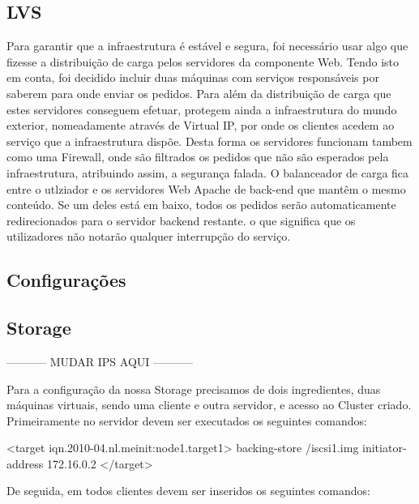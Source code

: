 \subsection{LVS}
Para garantir que a infraestrutura é estável e segura, foi necessário usar algo que fizesse a distribuição de carga pelos servidores da componente Web. Tendo isto em conta, foi decidido incluir duas máquinas com serviços responsáveis por saberem para onde enviar os pedidos. Para além da distribuição de carga que estes servidores conseguem efetuar, protegem ainda a infraestrutura do mundo exterior, nomeadamente através de Virtual IP, por onde os clientes acedem ao serviço que a infraestrutura dispõe. Desta forma os servidores funcionam tambem como uma Firewall, onde são filtrados os pedidos que não são esperados pela infraestrutura, atribuindo assim, a segurança falada.
O balanceador de carga fica entre o utlziador e os servidores Web Apache de back-end que mantêm o mesmo conteúdo. Se um deles está em baixo, todos os pedidos serão automaticamente redirecionados para o servidor backend restante. o que significa que os utilizadores não notarão qualquer interrupção do serviço.

\subsection{Configurações}

\subsection{Storage}
-----------
MUDAR IPS AQUI 
-----------

Para a configuração da nossa Storage precisamos de dois ingredientes, duas máquinas virtuais, sendo uma cliente e outra servidor, e acesso ao Cluster criado.
Primeiramente no servidor devem ser executados os seguintes comandos:
 \par
{} \par
    <target iqn.2010-04.nl.meinit:node1.target1>
    backing-store /iscsi1.img
    initiator-address 172.16.0.2
    </target>
 \par
{} \par
{} \par

De seguida, em todos clientes devem ser inseridos os seguintes comandos:
 \par
{} \par
{} \par
{} \par
{} \par

